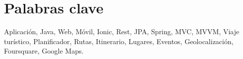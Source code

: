 \newpage
\chapter*{Palabras clave}


Aplicación, Java, Web, Móvil, Ionic, Rest, JPA, Spring, MVC, MVVM, Viaje turístico, Planificador, Rutas, Itinerario, Lugares, Eventos, Geolocalización, Foursquare, Google Maps.